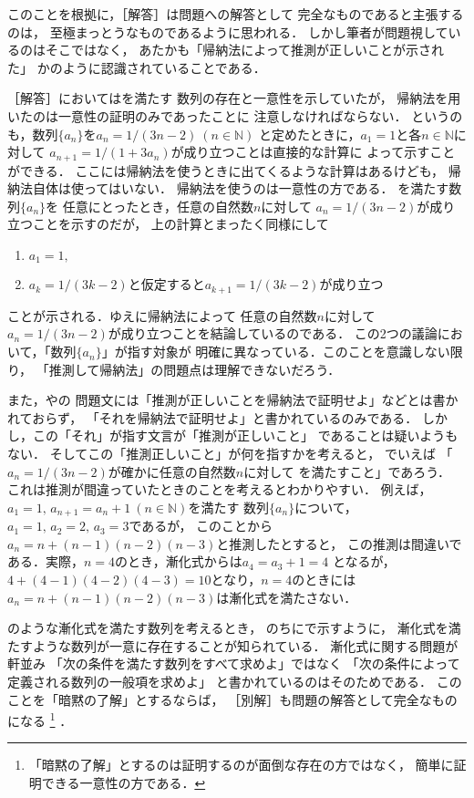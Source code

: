 \documentclass[11pt,a4paper]{ltjsarticle} %
\theoremstyle{mystyle} %
\begin{document}
このことを根拠に，［解答］は問題への解答として
完全なものであると主張するのは，
至極まっとうなものであるように思われる．
しかし筆者が問題視しているのはそこではなく，
あたかも「帰納法によって推測が正しいことが示された」
かのように認識されていることである．

［解答］においてはを満たす
数列の存在と一意性を示していたが，
帰納法を用いたのは一意性の証明のみであったことに
注意しなければならない．
というのも，数列$\{ a_n \}$を$a_n = 1/(3n-2) \ (n \in \mathbb{N})$
と定めたときに，$a_1 = 1$と各$n \in \mathbb{N}$に対して
$a_{n+1} = 1 / (1+ 3 a_n)$が成り立つことは直接的な計算に
よって示すことができる．
ここには帰納法を使うときに出てくるような計算はあるけども，
帰納法自体は使ってはいない．
帰納法を使うのは一意性の方である．
を満たす数列$\{ a_n \}$を
任意にとったとき，任意の自然数$n$に対して
$a_n = 1/(3n-2)$が成り立つことを示すのだが，
上の計算とまったく同様にして
\begin{enumerate}
  \item $a_1 = 1 ,$
  \item $a_k = 1/(3k-2)$と仮定すると$a_{k+1} = 1/(3k-2)$が成り立つ
\end{enumerate}
ことが示される．ゆえに帰納法によって
任意の自然数$n$に対して$a_n = 1/(3n-2)$が成り立つことを結論しているのである．
この2つの議論において，「数列$\{ a_n \}$」が指す対象が
明確に異なっている．このことを意識しない限り，
「推測して帰納法」の問題点は理解できないだろう．

また，やの
問題文には「推測が正しいことを帰納法で証明せよ」などとは書かれておらず，
「それを帰納法で証明せよ」と書かれているのみである．
しかし，この「それ」が指す文言が「推測が正しいこと」
であることは疑いようもない．
そしてこの「推測正しいこと」が何を指すかを考えると，
でいえば
「$a_n = 1/(3n-2)$が確かに任意の自然数$n$に対して
を満たすこと」であろう．
これは推測が間違っていたときのことを考えるとわかりやすい．
例えば，$a_1=1, \, a_{n+1} = a_n + 1 \ (n \in \mathbb{N})$を満たす
数列$\{ a_n \}$について，$a_1=1, \, a_2 = 2, \, a_3 = 3 $であるが，
このことから$a_n = n + (n-1)(n-2)(n-3)$と推測したとすると，
この推測は間違いである．実際，$n=4$のとき，漸化式からは$a_4 = a_3 + 1 = 4$
となるが，$4 + (4-1)(4-2)(4-3) = 10$となり，$n=4$のときには
$a_n = n + (n-1)(n-2)(n-3)$は漸化式を満たさない．


のような漸化式を満たす数列を考えるとき，
のちにで示すように，
漸化式を満たすような数列が一意に存在することが知られている．
漸化式に関する問題が軒並み
「次の条件を満たす数列をすべて求めよ」ではなく
「次の条件によって定義される数列の一般項を求めよ」
と書かれているのはそのためである．
このことを「暗黙の了解」とするならば，
［別解］も問題の解答として完全なものになる
\footnote{
  「暗黙の了解」とするのは証明するのが面倒な存在の方ではなく，
  簡単に証明できる一意性の方である．
}
．
\end{document}
